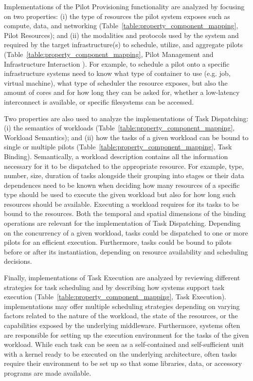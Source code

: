 \documentclass{sig-alternate}
\begin{document}
Implementations of the Pilot Provisioning functionality are analyzed by focusing
on two properties: (i) the type of resources the pilot system exposes such as
compute, data, and networking (Table~\ref{table:property_component_mapping},
Pilot Resources); and (ii) the modalities and protocols used by the \pilot
system and required by the target infrastructure(s) to schedule, utilize, and
aggregate pilots (Table~\ref{table:property_component_mapping}, Pilot Management
and Infrastructure Interaction ). For example, to schedule a pilot onto a specific infrastructure
\pilot systems need to know what type of container to use (e.g.  job, virtual
machine), what type of scheduler the resource exposes, but also the amount of
cores and for how long they can be asked for, whether a low-latency interconnect
is available, or specific filesystems can be accessed.

Two properties are also used to analyze the implementations of Task
Dispatching: (i) the semantics of workloads
(Table~\ref{table:property_component_mapping}, Workload Semantics); and (ii)
how the tasks of a given workload can be bound to single or multiple pilots
(Table~\ref{table:property_component_mapping}, Task Binding). Semantically, a
workload description contains all the information necessary for it to be
dispatched to the appropriate resource. For example, type, number, size,
duration of tasks alongside their grouping into stages or their data
dependences need to be known when deciding how many resources of a specific
type should be used to execute the given workload but also for how long such
resources should be available. Executing a workload requires for its tasks to
be bound to the resources. Both the temporal and spatial dimensions of the
binding operations are relevant for the implementation of Task Dispatching.
Depending on the concurrency of a given workload, tasks could be dispatched to
one or more pilots for an efficient execution. Furthermore, tasks could be
bound to pilots before or after its instantiation, depending on resource
availability and scheduling decisions.

Finally, implementations of Task Execution are analyzed by reviewing different
strategies for task scheduling and by describing how \pilot systems support
task execution (Table~\ref{table:property_component_mapping}, Task Execution).
\pilot implementations may offer multiple scheduling strategies depending on
varying factors related to the nature of the workload, the state of the
resources, or the capabilities exposed by the underlying middleware.
Furthermore, \pilot systems often are responsible for setting up the execution
environment for the tasks of the given workload. While each task can be seen as
a self-contained and self-sufficient unit with a kernel ready to be executed on
the underlying architecture, often tasks require their environment to be set up
so that some libraries, data, or accessory programs are made available.
\end{document}
